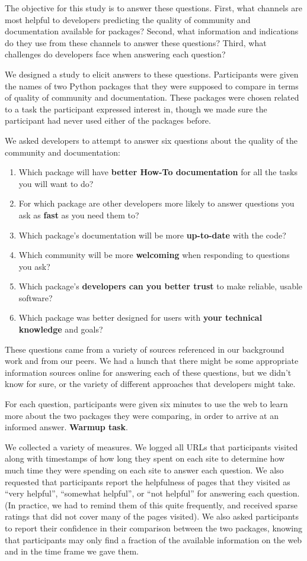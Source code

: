 The objective for this study is to answer these questions.
First, what channels are most helpful to developers predicting the quality of community and documentation available for packages?
Second, what information and indications do they use from these channels to answer these questions?
Third, what challenges do developers face when answering each question?

We designed a study to elicit answers to these questions.
Participants were given the names of two Python packages that they were supposed to compare in terms of quality of community and documentation.
These packages were chosen related to a task the participant expressed interest in, though we made sure the participant had never used either of the packages before.

We asked developers to attempt to answer six questions about the quality of the community and documentation:
\begin{enumerate}
\setlength{\itemsep}{0pt}
\setlength{\parskip}{0pt}
\setlength{\parsep}{0pt}
\item Which package will have \textbf{better How-To documentation} for all the tasks you will want to do?
\item For which package are other developers more likely to answer questions you ask as \textbf{fast} as you need them to?
\item Which package's documentation will be more \textbf{up-to-date} with the code?
\item Which community will be more \textbf{welcoming} when responding to questions you ask?
\item Which package's \textbf{developers can you better trust} to make reliable, usable software?
\item Which package was better designed for users with \textbf{your technical knowledge} and goals?
\end{enumerate}
These questions came from a variety of sources referenced in our background work and from our peers.
We had a hunch that there might be some appropriate information sources online for answering each of these questions, but we didn't know for sure, or the variety of different approaches that developers might take.

For each question, participants were given six minutes to use the web to learn more about the two packages they were comparing, in order to arrive at an informed answer.
\textbf{Warmup task}.

We collected a variety of measures.
We logged all URLs that participants visited along with timestamps of how long they spent on each site to determine how much time they were spending on each site to answer each question.
We also requested that participants report the helpfulness of pages that they visited as ``very helpful'', ``somewhat helpful'', or ``not helpful'' for answering each question.
(In practice, we had to remind them of this quite frequently, and received sparse ratings that did not cover many of the pages visited).
We also asked participants to report their confidence in their comparison between the two packages, knowing that participants may only find a fraction of the available information on the web and in the time frame we gave them.

